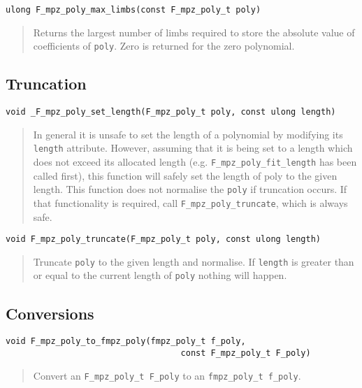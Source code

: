 \documentclass[a4paper,10pt]{article}
\newcommand{\code}{\lstinline}
\begin{document}
\begin{lstlisting}
ulong F_mpz_poly_max_limbs(const F_mpz_poly_t poly)
\end{lstlisting}
\begin{quote}
Returns the largest number of limbs required to store the absolute value of coefficients of \code{poly}. 
Zero is returned for the zero polynomial.
\end{quote}

\subsection{Truncation}

\begin{lstlisting}
void _F_mpz_poly_set_length(F_mpz_poly_t poly, const ulong length)
\end{lstlisting}
\begin{quote}
In general it is unsafe to set the length of a polynomial by modifying its \code{length} attribute. 
However, assuming that it is being set to a length which does not exceed its allocated length (e.g.
\code{F_mpz_poly_fit_length} has been called first), this function will safely set the length of 
poly to the given length. This function does not normalise the \code{poly} if truncation occurs. If
that functionality is required, call \code{F_mpz_poly_truncate}, which is always safe.
\end{quote}

\begin{lstlisting}
void F_mpz_poly_truncate(F_mpz_poly_t poly, const ulong length)
\end{lstlisting}
\begin{quote}
Truncate \code{poly} to the given length and normalise. If \code{length} is greater than or equal to
the current length of \code{poly} nothing will happen.
\end{quote}

\subsection{Conversions}

\begin{lstlisting}
void F_mpz_poly_to_fmpz_poly(fmpz_poly_t f_poly, 
                                   const F_mpz_poly_t F_poly)
\end{lstlisting}
\begin{quote}
Convert an \code{F_mpz_poly_t F_poly} to an \code{fmpz_poly_t f_poly}.
\end{quote}
\end{document}
